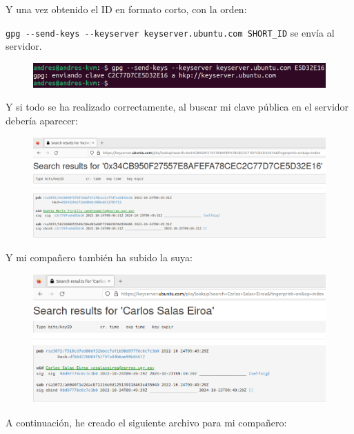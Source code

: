 \documentclass{article}
\begin{document}
Y una vez obtenido el ID en formato corto, con la orden:

\verb|gpg --send-keys --keyserver keyserver.ubuntu.com SHORT_ID| se envía al servidor. 

\begin{figure}[H]
    \includegraphics[width=\textwidth]{imagenes/Portatil/Captura desde 2022-10-24 11-58-08.png}
\end{figure}

Y si todo se ha realizado correctamente, al buscar mi clave pública en el servidor debería aparecer:


\begin{figure}[H]
    \includegraphics[width=\textwidth]{imagenes/Portatil/Captura desde 2022-10-24 12-01-53.png}
\end{figure}

Y mi compañero también ha subido la suya:

\begin{figure}[H]
    \includegraphics[width=\textwidth]{imagenes/Portatil/Captura desde 2022-10-24 12-05-30.png}
\end{figure}


A continuación, he creado el siguiente archivo para mi compañero:
\end{document}
